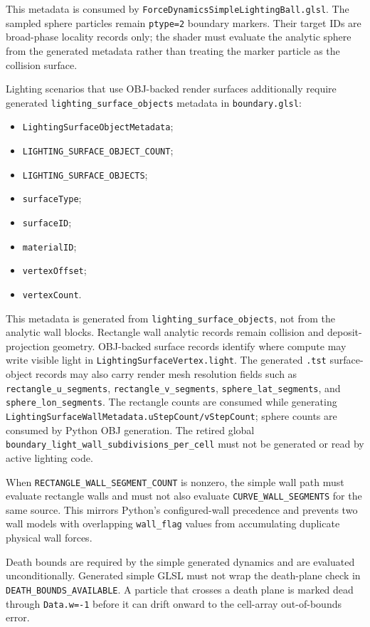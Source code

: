 This metadata is consumed by
\texttt{ForceDynamicsSimpleLightingBall.glsl}.  The sampled sphere particles
remain \texttt{ptype=2} boundary markers.  Their target IDs are
broad-phase locality records only; the shader must evaluate the analytic
sphere from the generated metadata rather than treating the marker particle
as the collision surface.

Lighting scenarios that use OBJ-backed render surfaces additionally require
generated \texttt{lighting\_surface\_objects} metadata in
\texttt{boundary.glsl}:
\begin{itemize}
    \item \texttt{LightingSurfaceObjectMetadata};
    \item \texttt{LIGHTING\_SURFACE\_OBJECT\_COUNT};
    \item \texttt{LIGHTING\_SURFACE\_OBJECTS};
    \item \texttt{surfaceType};
    \item \texttt{surfaceID};
    \item \texttt{materialID};
    \item \texttt{vertexOffset};
    \item \texttt{vertexCount}.
\end{itemize}
This metadata is generated from \texttt{lighting\_surface\_objects}, not from
the analytic wall blocks.  Rectangle wall analytic records remain collision
and deposit-projection geometry.  OBJ-backed surface records identify where
compute may write visible light in \texttt{LightingSurfaceVertex.light}.
The generated \texttt{.tst} surface-object records may also carry render mesh
resolution fields such as \texttt{rectangle\_u\_segments},
\texttt{rectangle\_v\_segments}, \texttt{sphere\_lat\_segments}, and
\texttt{sphere\_lon\_segments}.  The rectangle counts are consumed while
generating \texttt{LightingSurfaceWallMetadata.uStepCount/vStepCount}; sphere
counts are consumed by Python OBJ generation.
The retired global
\texttt{boundary\_light\_wall\_subdivisions\_per\_cell} must not be generated
or read by active lighting code.

When \texttt{RECTANGLE\_WALL\_SEGMENT\_COUNT} is nonzero, the simple wall
path must evaluate rectangle walls and must not also evaluate
\texttt{CURVE\_WALL\_SEGMENTS} for the same source.  This mirrors Python's
configured-wall precedence and prevents two wall models with overlapping
\texttt{wall\_flag} values from accumulating duplicate physical wall forces.

Death bounds are required by the simple generated dynamics and are evaluated
unconditionally.  Generated simple GLSL must not wrap the death-plane check in
\texttt{DEATH\_BOUNDS\_AVAILABLE}.  A particle that crosses a death plane is
marked dead through \texttt{Data.w=-1} before it can drift onward to the
cell-array out-of-bounds error.

